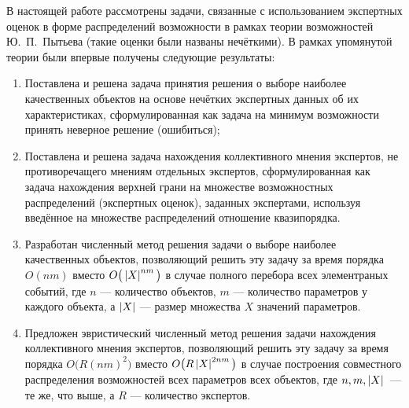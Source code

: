 
В настоящей работе рассмотрены задачи, связанные с  использованием экспертных оценок в форме распределений возможности в рамках теории возможностей Ю.~П.~Пытьева (такие оценки были названы нечёткими). В рамках упомянутой теории были впервые получены следующие результаты:
\begin{enumerate}
\item
Поставлена и решена задача принятия решения о выборе наиболее качественных объектов на основе нечётких экспертных данных об их характеристиках, сформулированная как задача на минимум возможности принять неверное решение (ошибиться);
\item
Поставлена и решена задача нахождения коллективного мнения экспертов, не противоречащего мнениям отдельных экспертов, сформулированная как задача нахождения верхней грани на множестве возможностных распределений (экспертных оценок), заданных экспертами, используя введённое на множестве распределений отношение квазипорядка.
\item 
Разработан численный метод решения задачи о выборе наиболее качественных объектов, %
позволяющий решить эту задачу за время порядка $O(nm)$ вместо $O\big(\left| X \right|^{nm}\big)$ в случае полного перебора всех элементраных событий, где $n$ --- количество объектов, $m$ --- количество параметров у каждого объекта, а $\left| X \right|$ --- размер множества $X$ значений параметров.
 \item
Предложен эвристический численный метод решения задачи нахождения коллективного мнения экспертов, позволяющий решить эту задачу за время порядка $O\big(R(nm)^2\big)$ вместо $O\big(R\left| X \right|^{2nm}\big)$ в случае построения совместного распределения возможностей всех параметров всех объектов, где $n,m,\left| X \right|$~--- те же, что выше, а $R$ --- количество экспертов. %
\end{enumerate}
